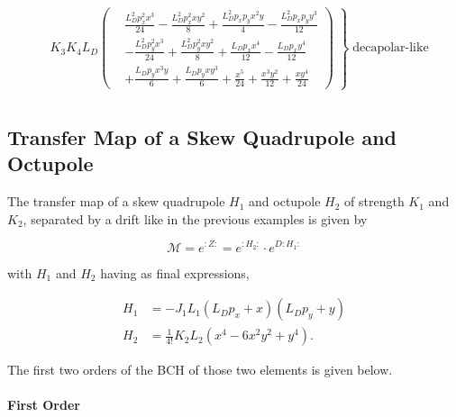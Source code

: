 \footnotesize
\begin{equation}
  \begin{aligned}
    &K_{3} K_{4} L_{D} \left.\left(
    \begin{aligned}
      &\frac{L_{D}^{2} p_{x}^{2} x^{3}}{24} - \frac{L_{D}^{2} p_{x}^{2} x y^{2}}{8} + \frac{L_{D}^{2} p_{x} p_{y} x^{2} y}{4} - \frac{L_{D}^{2} p_{x} p_{y} y^{3}}{12} \\
      &- \frac{L_{D}^{2} p_{y}^{2} x^{3}}{24} + \frac{L_{D}^{2} p_{y}^{2} x y^{2}}{8} + \frac{L_{D} p_{x} x^{4}}{12} - \frac{L_{D} p_{x} y^{4}}{12} \\
      &+ \frac{L_{D} p_{y} x^{3} y}{6} + \frac{L_{D} p_{y} x y^{3}}{6} + \frac{x^{5}}{24} + \frac{x^{3} y^{2}}{12} + \frac{x y^{4}}{24}
    \end{aligned} 
    \right) \;\right\} \; \text{decapolar-like}\\
  \end{aligned}
\end{equation}
\normalsize



\subsection{Transfer Map of a Skew Quadrupole and Octupole}
\label{appendix:transfer_map:skew_quadrupole_and_octupole}

The transfer map of a skew quadrupole $H_1$ and octupole $H_2$ of strength $K_1$ and $K_2$,
separated by a drift like in the previous examples is given by

\begin{equation}
  \mathcal{M} = e^{:Z:} = e^{:H_2:} \cdot e^{D:H_1:}
\end{equation}

with $H_1$ and $H_2$ having as final expressions,

\begin{equation}
  \begin{aligned}
    H_1 &= - J_{1} L_{1} \left(L_{D} p_{x} + x\right) \left(L_{D} p_{y} + y\right) \\
    H_2 &= \frac{1}{4!} K_{2} L_{2} \left(x^{4} - 6 x^{2} y^{2} + y^{4}\right).
  \end{aligned}
\end{equation}

The first two orders of the BCH of those two elements is given below.

\paragraph{First Order}

